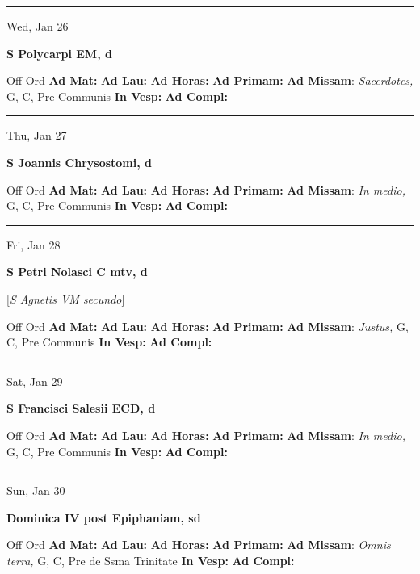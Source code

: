 \documentclass[letterpaper, 10pt]{article}
\begin{document}
\hrule
\begin{center}
Wed, Jan 26
\end{center}\textbf{ \large S Polycarpi EM, \textnormal{\normalsize d}}
\begin{justify}
Off Ord
\textbf{Ad Mat: }
\textbf{Ad Lau: }
\textbf{Ad Horas: }
\textbf{Ad Primam: }
\textbf{Ad Missam}: \textit{Sacerdotes,} G, C, Pre Communis
\textbf{In Vesp: }
\textbf{Ad Compl: }\end{justify}



\hrule
\begin{center}
Thu, Jan 27
\end{center}\textbf{ \large S Joannis Chrysostomi, \textnormal{\normalsize d}}
\begin{justify}
Off Ord
\textbf{Ad Mat: }
\textbf{Ad Lau: }
\textbf{Ad Horas: }
\textbf{Ad Primam: }
\textbf{Ad Missam}: \textit{In medio,} G, C, Pre Communis
\textbf{In Vesp: }
\textbf{Ad Compl: }\end{justify}



\hrule
\begin{center}
Fri, Jan 28
\end{center}\textbf{ \large S Petri Nolasci C mtv, \textnormal{\normalsize d}}

[\textit{S Agnetis VM secundo}]
\begin{justify}
Off Ord
\textbf{Ad Mat: }
\textbf{Ad Lau: }
\textbf{Ad Horas: }
\textbf{Ad Primam: }
\textbf{Ad Missam}: \textit{Justus,} G, C, Pre Communis
\textbf{In Vesp: }
\textbf{Ad Compl: }\end{justify}



\hrule
\begin{center}
Sat, Jan 29
\end{center}\textbf{ \large S Francisci Salesii ECD, \textnormal{\normalsize d}}
\begin{justify}
Off Ord
\textbf{Ad Mat: }
\textbf{Ad Lau: }
\textbf{Ad Horas: }
\textbf{Ad Primam: }
\textbf{Ad Missam}: \textit{In medio,} G, C, Pre Communis
\textbf{In Vesp: }
\textbf{Ad Compl: }\end{justify}



\hrule
\begin{center}
Sun, Jan 30
\end{center}\textbf{ \large Dominica IV post Epiphaniam, \textnormal{\normalsize sd}}
\begin{justify}
Off Ord
\textbf{Ad Mat: }
\textbf{Ad Lau: }
\textbf{Ad Horas: }
\textbf{Ad Primam: }
\textbf{Ad Missam}: \textit{Omnis terra,} G, C, Pre de Ssma Trinitate
\textbf{In Vesp: }
\textbf{Ad Compl: }\end{justify}
\end{document}

